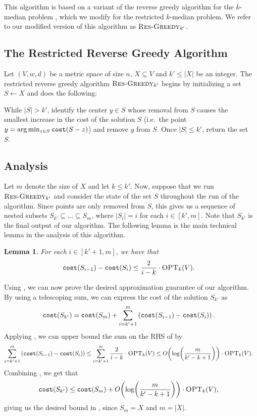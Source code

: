 \documentclass[11pt]{article}
\newenvironment{wrapper}[1]
{
\begin{center}
		\begin{minipage}{\linewidth}
			\begin{mdframed}[hidealllines=true, backgroundcolor=gray!20, leftmargin=0cm,innerleftmargin=0.4cm,innerrightmargin=0.4cm,innertopmargin=0.4cm,innerbottommargin=0.4cm,roundcorner=0pt]
				#1}
			{\end{mdframed}
		\end{minipage}
	\end{center}
}
\newcommand{\1}{\mathmybb{1}}
\newtheorem{lemma}[theorem]{Lemma}
\newcommand{\OPT}{\textsc{OPT}}
\newcommand{\cost}{\textnormal{\texttt{cost}}}
\newcommand{\Restr}{\textnormal{\textsc{Res-Greedy}}}
\begin{document}
This algorithm is based on a variant of the reverse greedy algorithm for the $k$-median problem \cite{ChrobakKY06}, which we modify for the restricted $k$-median problem. We refer to our modified version of this algorithm as $\Restr_{k'}$.

\subsection{The Restricted Reverse Greedy Algorithm}

Let $(V, w, d)$ be a metric space of size $n$, $X \subseteq V$ and $k' \leq |X|$ be an integer. The restricted reverse greedy algorithm $\Restr_{k'}$ begins by initializing a set $S \leftarrow X$ and does the following:
\begin{wrapper}
While $|S| > k'$, identify the center $y \in S$ whose removal from $S$ causes the smallest increase in the cost of the solution $S$ (i.e.~the point $y = \arg \min_{z \in S} \cost(S - z)$) and remove $y$ from $S$. Once $|S| \leq k'$, return the set $S$.
\end{wrapper}

\subsection{Analysis}

Let $m$ denote the size of $X$ and let $k \leq k'$.
Now, suppose that we run $\Restr_{k'}$ and consider the state of the set $S$ throughout the run of the algorithm. Since points are only removed from $S$,
this gives us a sequence of nested subsets $S_{k'} \subseteq \dots \subseteq S_{m}$, where $|S_i| = i$ for each $i \in [k', m]$. Note that $S_{k'}$ is the final output of our algorithm. The following lemma is the main technical lemma in the analysis of this algorithm.

\begin{lemma}\label{lem:greedy:main}
    For each $i \in [k' + 1, m]$, we have that $$\cost(S_{i-1}) - \cost(S_i) \leq \frac{2}{i - k} \cdot \OPT_k(V).$$
\end{lemma}

Using , we can now prove the desired approximation guarantee of our algorithm.
By using a telescoping sum, we can express the cost of the solution $S_{k'}$ as
\begin{equation}\label{eq:greedy:1}
    \cost(S_{k'}) = \cost(S_{m}) + \sum_{i = k' + 1}^m \left(\cost(S_{i-1}) - \cost(S_i) \right).
\end{equation}
Applying , we can upper bound the sum on the RHS of  by
\begin{equation}\label{eq:greedy:2}
\sum_{i = k' + 1}^m \left(\cost(S_{i-1}) - \cost(S_i) \right) \leq \sum_{i = k' + 1}^m \frac{2}{i - k} \cdot \OPT_k(V) \leq O \! \left(\log \! \left(\frac{m}{k' - k + 1} \right) \right) \cdot \OPT_k(V).
\end{equation}
Combining , we get that
$$ \cost(S_{k'}) \leq \cost(S_m) + O \! \left(\log \! \left(\frac{m}{k' - k + 1} \right) \right) \cdot \OPT_k(V), $$
giving us the desired bound in , since $S_m = X$ and $m = |X|$.
\end{document}
